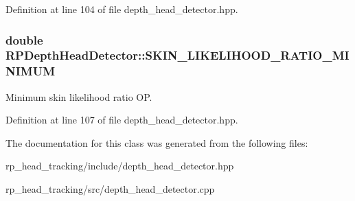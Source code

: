 \-Definition at line 104 of file depth\-\_\-head\-\_\-detector.\-hpp.

\hypertarget{class_r_p_depth_head_detector_ab63e81e4e717743a28710494824e7eea}{
\subsubsection[{\-S\-K\-I\-N\-\_\-\-L\-I\-K\-E\-L\-I\-H\-O\-O\-D\-\_\-\-R\-A\-T\-I\-O\-\_\-\-M\-I\-N\-I\-M\-U\-M}]{\setlength{\rightskip}{0pt plus 5cm}double {\bf \-R\-P\-Depth\-Head\-Detector\-::\-S\-K\-I\-N\-\_\-\-L\-I\-K\-E\-L\-I\-H\-O\-O\-D\-\_\-\-R\-A\-T\-I\-O\-\_\-\-M\-I\-N\-I\-M\-U\-M}}}\label{class_r_p_depth_head_detector_ab63e81e4e717743a28710494824e7eea}
\-Minimum skin likelihood ratio \-O\-P. 

\-Definition at line 107 of file depth\-\_\-head\-\_\-detector.\-hpp.



\-The documentation for this class was generated from the following files\-:\begin{DoxyCompactItemize}
\item 
rp\-\_\-head\-\_\-tracking/include/depth\-\_\-head\-\_\-detector.\-hpp\item 
rp\-\_\-head\-\_\-tracking/src/depth\-\_\-head\-\_\-detector.\-cpp\end{DoxyCompactItemize}
